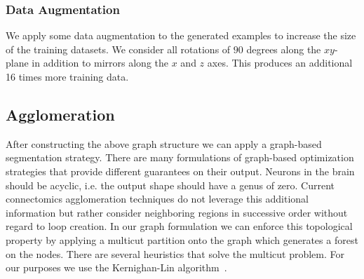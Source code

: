 \subsubsection{Data Augmentation}

We apply some data augmentation to the generated examples to increase the size of the training datasets. 
We consider all rotations of $90$ degrees along the $xy$-plane in addition to mirrors along the $x$ and $z$ axes. 
This produces an additional 16 times more training data. 

\subsection{Agglomeration}

After constructing the above graph structure we can apply a graph-based segmentation strategy. 
There are many formulations of graph-based optimization strategies that provide different guarantees on their output. 
Neurons in the brain should be acyclic, i.e. the output shape should have a genus of zero. 
Current connectomics agglomeration techniques do not leverage this additional information but rather consider neighboring regions in successive order without regard to loop creation. 
In our graph formulation we can enforce this topological property by applying a multicut partition onto the graph which generates a forest on the nodes. 
There are several heuristics that solve the multicut problem. For our purposes we use the Kernighan-Lin algorithm~\cite{kernighan1970efficient}.
